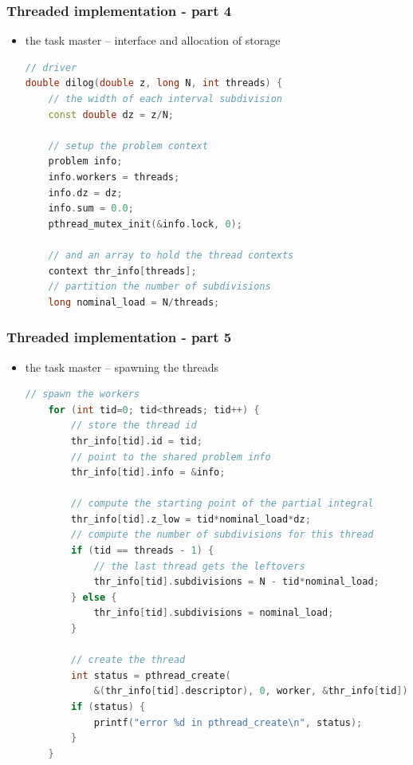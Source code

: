 \begin{frame}[fragile]
%
  \frametitle{Threaded implementation - part 4}
%
  \begin{itemize}
  \item the task master -- interface and allocation of storage
  \begin{lstlisting}[language=c++,name=threaded]
// driver
double dilog(double z, long N, int threads) {
    // the width of each interval subdivision
    const double dz = z/N;

    // setup the problem context
    problem info;
    info.workers = threads;
    info.dz = dz;
    info.sum = 0.0;
    pthread_mutex_init(&info.lock, 0);

    // and an array to hold the thread contexts
    context thr_info[threads];
    // partition the number of subdivisions
    long nominal_load = N/threads;
  \end{lstlisting}
%
  \end{itemize}
%
\end{frame}

\begin{frame}[fragile]
%
  \frametitle{Threaded implementation - part 5}
%
  \begin{itemize}
  \item the task master -- spawning the threads
  \begin{lstlisting}[language=c++,name=threaded]
    // spawn the workers
    for (int tid=0; tid<threads; tid++) {
        // store the thread id
        thr_info[tid].id = tid;
        // point to the shared problem info
        thr_info[tid].info = &info;

        // compute the starting point of the partial integral
        thr_info[tid].z_low = tid*nominal_load*dz;
        // compute the number of subdivisions for this thread
        if (tid == threads - 1) {
            // the last thread gets the leftovers
            thr_info[tid].subdivisions = N - tid*nominal_load;
        } else {
            thr_info[tid].subdivisions = nominal_load;
        }

        // create the thread
        int status = pthread_create(
            &(thr_info[tid].descriptor), 0, worker, &thr_info[tid]);
        if (status) {
            printf("error %d in pthread_create\n", status);
        }
    }
  \end{lstlisting}
%
  \end{itemize}
%
\end{frame}

